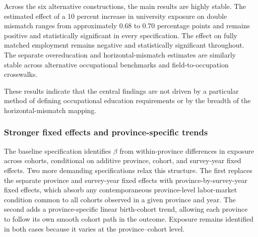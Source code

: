 Across the six alternative constructions, the main results are highly stable. The estimated effect of a 10 percent increase in university exposure on double mismatch ranges from approximately 0.68 to 0.70 percentage points and remains positive and statistically significant in every specification. The effect on fully matched employment remains negative and statistically significant throughout. The separate overeducation and horizontal-mismatch estimates are similarly stable across alternative occupational benchmarks and field-to-occupation crosswalks.

These results indicate that the central findings are not driven by a particular method of defining occupational education requirements or by the breadth of the horizontal-mismatch mapping.

\subsubsection{Stronger fixed effects and province-specific trends}
\label{sec:feladder}

The baseline specification identifies $\beta$ from within-province differences in exposure across cohorts, conditional on additive province, cohort, and survey-year fixed effects. Two more demanding specifications relax this structure. The first replaces the separate province and survey-year fixed effects with province-by-survey-year fixed effects, which absorb any contemporaneous province-level labor-market condition common to all cohorts observed in a given province and year. The second adds a province-specific linear birth-cohort trend, allowing each province to follow its own smooth cohort path in the outcome. Exposure remains identified in both cases because it varies at the province--cohort level.

